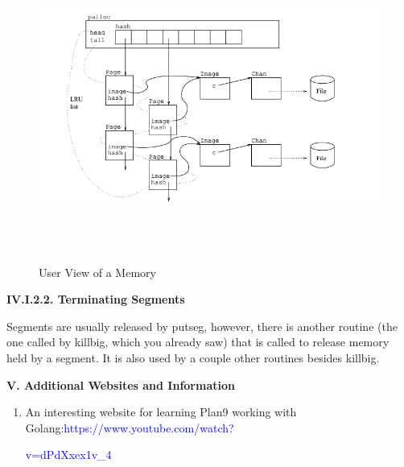 \documentclass[a4paper,12pt]{report}
\begin{document}
\begin{figure}[h]
\centering	
\includegraphics[width=16cm, height=10cm]{"pic4"}
\caption{User View of a Memory}
\end{figure}

\noindent
\textbf{IV.I.2.2. Terminating Segments}

\noindent
Segments are usually released by putseg, however, there is another routine (the one called by killbig, which you already saw) that is called to release memory held by a segment. It is also used by a couple other routines besides killbig.

\noindent
\textbf{V. Additional Websites and Information}
\begin{enumerate}
\item An interesting website for learning Plan9 working with Golang:\textcolor{blue}{https://www.youtube.com/watch?}

\textcolor{blue}{v=dPdXxex1v\_4}
\end{enumerate}
\end{document}
